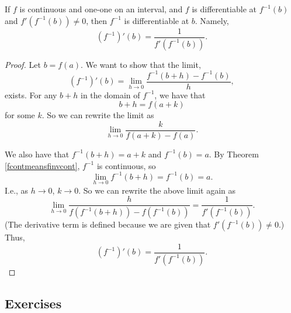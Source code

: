 \begin{theorem} \label{fdiffmeansfinvdiff}
If $f$ is continuous and one-one on an interval, and $f$ is differentiable at $f^{-1}(b)$ and $f'(f^{-1}(b)) \ne 0$, then $f^{-1}$ is differentiable at $b$. Namely,
\[ (f^{-1})'(b) = \frac{1}{f'(f^{-1}(b))}. \]

\begin{proof}
Let $b = f(a)$. We want to show that the limit,
\[ (f^{-1})'(b) = \lim_{h \to 0} \frac{f^{-1}(b + h) - f^{-1}(b)}h, \]
exists. For any $b + h$ in the domain of $f^{-1}$, we have that
\[ b + h = f(a + k) \]
for some $k$. So we can rewrite the limit as
\[ \lim_{h \to 0} \frac{k}{f(a+k)-f(a)}. \]

We also have that $f^{-1}(b + h) = a + k$ and $f^{-1}(b) = a$. By Theorem \ref{fcontmeansfinvcont}, $f^{-1}$ is continuous, so
\[ \lim_{h \to 0} f^{-1}(b + h) = f^{-1}(b) = a. \]
I.e., as $h \to 0$, $k \to 0$. So we can rewrite the above limit again as
\[ \lim_{h \to 0} \frac{h}{f(f^{-1}(b+h))-f(f^{-1}(b))} = \frac{1}{f'(f^{-1}(b))}. \]
(The derivative term is defined because we are given that $f'(f^{-1}(b)) \ne 0$.) Thus, 
\[ (f^{-1})'(b) = \frac{1}{f'(f^{-1}(b))}. \]
\end{proof}
\end{theorem}

\subsection{Exercises}

